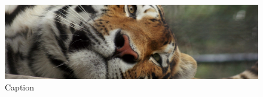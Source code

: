 \documentclass[12pt]{article}
\begin{document}
\begin{figure}[h!]
    \centering
    \includegraphics[width=\textwidth]{animals/animal1.jpeg}
    \caption{Caption}
    \label{fig:my_label}
\end{figure}
\end{document}
